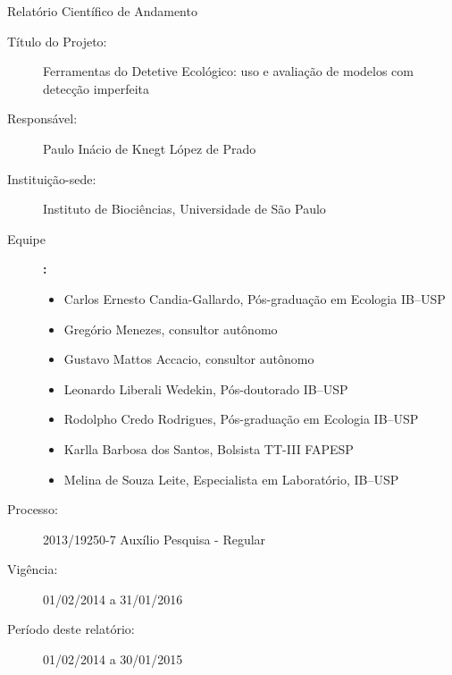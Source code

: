 \documentclass[12pt, A4]{article}
\begin{document}
\pagestyle{fancyplain}
\rhead[\fancyplain{}{\textsl{\thepage}}]%
      {\fancyplain{}{\textsl{\thepage}}}
\cfoot[]{}
\thispagestyle{empty}
\begin{center}
  {\LARGE Relatório Científico de Andamento} 
\end{center}
\begin{description}
\item[Título do Projeto:] Ferramentas do Detetive Ecológico: uso e avaliação de modelos com detecção imperfeita
\item[Responsável:] Paulo Inácio de Knegt López de Prado
\item[Instituição-sede:] Instituto de Biociências, Universidade de São Paulo
\item[Equipe]{\bf:}
  \begin{itemize}
  \item Carlos Ernesto Candia-Gallardo, Pós-graduação em Ecologia IB--USP
  \item Gregório Menezes, consultor autônomo
  \item Gustavo Mattos Accacio, consultor autônomo
  \item Leonardo Liberali Wedekin, Pós-doutorado IB--USP
  \item Rodolpho Credo Rodrigues, Pós-graduação em Ecologia IB--USP
  \item Karlla Barbosa dos Santos, Bolsista TT-III FAPESP
  \item Melina de Souza Leite, Especialista em Laboratório, IB--USP
  \end{itemize}
\item[Processo:] 2013/19250-7 Auxílio Pesquisa - Regular 
\item[Vigência:] 01/02/2014 a 31/01/2016 
\item[Período deste relatório:] 01/02/2014 a 30/01/2015
\end{description}
\end{document}
